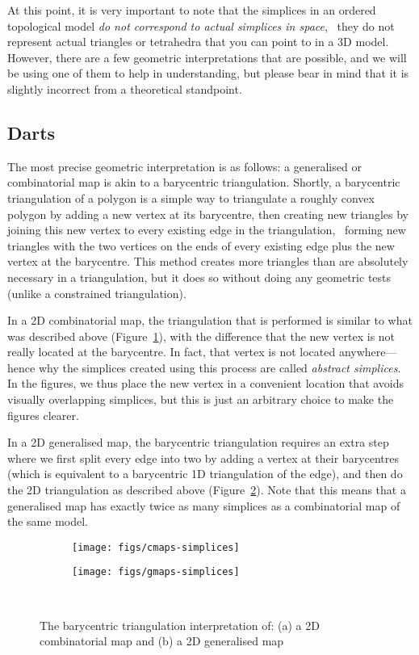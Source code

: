 At this point, it is very important to note that the simplices in an ordered topological model \emph{do not correspond to actual simplices in space}, \ie\ they do not represent actual triangles or tetrahedra that you can point to in a 3D model.
However, there are a few geometric interpretations that are possible, and we will be using one of them to help in understanding, but please bear in mind that it is slightly incorrect from a theoretical standpoint.

\subsection{Darts}

The most precise geometric interpretation is as follows: a generalised or combinatorial map is akin to a barycentric triangulation.
Shortly, a barycentric triangulation of a polygon is a simple way to triangulate a roughly convex polygon by adding a new vertex at its barycentre, then creating new triangles by joining this new vertex to every existing edge in the triangulation, \ie\ forming new triangles with the two vertices on the ends of every existing edge plus the new vertex at the barycentre.
This method creates more triangles than are absolutely necessary in a triangulation, but it does so without doing any geometric tests (unlike a constrained triangulation).

In a 2D combinatorial map, the triangulation that is performed is similar to what was described above (Figure~\ref{subfig:cmaps-simplices}), with the difference that the new vertex is not really located at the barycentre.
In fact, that vertex is not located anywhere---hence why the simplices created using this process are called \emph{abstract simplices}.
In the figures, we thus place the new vertex in a convenient location that avoids visually overlapping simplices, but this is just an arbitrary choice to make the figures clearer.

In a 2D generalised map, the barycentric triangulation requires an extra step where we first split every edge into two by adding a vertex at their barycentres (which is equivalent to a barycentric 1D triangulation of the edge), and then do the 2D triangulation as described above (Figure~\ref{subfig:gmaps-simplices}).
Note that this means that a generalised map has exactly twice as many simplices as a combinatorial map of the same model.

\begin{figure}
\centering
\begin{subfigure}{0.3\linewidth}
\texttt{[image: figs/cmaps-simplices]}
\caption{}%
\label{subfig:cmaps-simplices}
\end{subfigure}
\quad
\begin{subfigure}{0.3\linewidth}
\texttt{[image: figs/gmaps-simplices]}
\caption{}%
\label{subfig:gmaps-simplices}
\end{subfigure}\\
\caption{The barycentric triangulation interpretation of: (a) a 2D combinatorial map and (b) a 2D generalised map}%
\label{fig:maps-simplices}
\end{figure}

